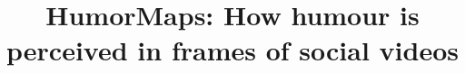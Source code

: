 \documentclass[letterpaper]{article}
\begin{document}
\title{HumorMaps: How humour is perceived in frames of social videos}

\maketitle 





   
\end{document}
